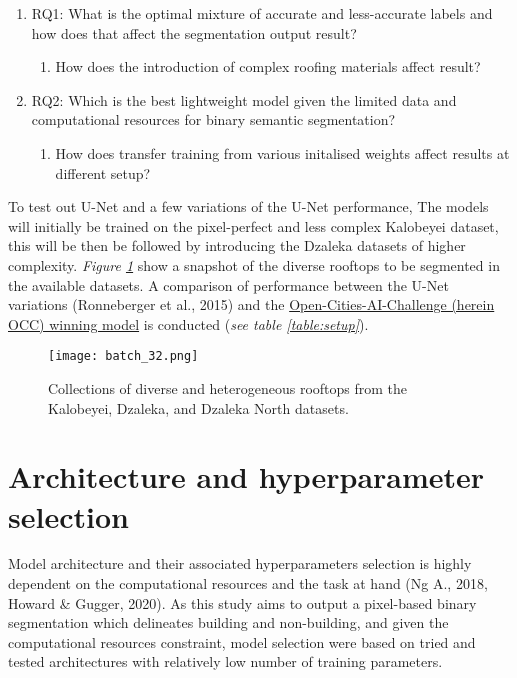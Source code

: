 \documentclass[11pt, a4paper, twoside]{report}
\begin{document}
\begin{enumerate}
  \item RQ1: What is the optimal mixture of accurate and less-accurate labels and how does that affect the segmentation output result?
    \begin{enumerate}
      \item How does the introduction of complex roofing materials affect result?
    \end{enumerate}
  \item RQ2: Which is the best lightweight model given the limited data and computational resources for binary semantic segmentation?
    \begin{enumerate}
      \item How does transfer training from various initalised weights affect results at different setup?
    \end{enumerate}
\end{enumerate}

To test out U-Net and a few variations of the U-Net performance, The models will initially be trained on the pixel-perfect and less complex Kalobeyei dataset, this will be then be followed by introducing the Dzaleka datasets of higher complexity. \textit{Figure \ref{fig:rooftops}} show a snapshot of the diverse rooftops to be segmented in the available datasets. A comparison of performance between the U-Net variations (Ronneberger et al., 2015) and the \href{https://github.com/drivendataorg/open-cities-ai-challenge/tree/master/1st\%20Place}{Open-Cities-AI-Challenge (herein OCC) winning model} is conducted (\textit{see table \ref{table:setup}}).\\\par

\begin{figure}[H]
  \centering
  \texttt{[image: batch\_32.png]}
  \caption{Collections of diverse and heterogeneous rooftops from the Kalobeyei, Dzaleka, and Dzaleka North datasets.}
  \label{fig:rooftops}
\end{figure}

\section{Architecture and hyperparameter selection}\label{Arch&Hyperparam}

Model architecture and their associated hyperparameters selection is highly dependent on the computational resources and the task at hand (Ng A., 2018, Howard \& Gugger, 2020). As this study aims to output a pixel-based binary segmentation which delineates building and non-building, and given the computational resources constraint, model selection were based on tried and tested architectures with relatively low number of training parameters.\\\par
\end{document}
